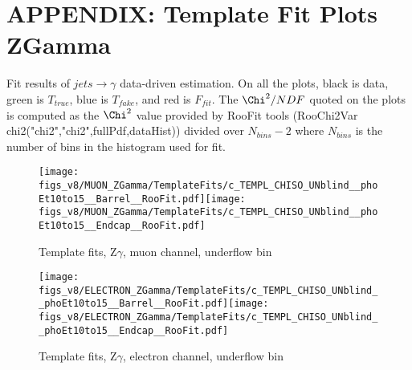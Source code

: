 \section{APPENDIX: Template Fit Plots ZGamma}
\label{sec:TemplateFitPlots}

Fit results of $jets \rightarrow \gamma$ data-driven estimation. On all the plots, black is data, green is $T_{true}$, blue is $T_{fake}$, and red is $F_{fit}$. The $\Chi^2/{NDF}$ quoted on the plots is computed as the $\Chi^2$ value provided by RooFit tools (RooChi2Var chi2("chi2","chi2",fullPdf,dataHist)) divided over $N_{bins}-2$ where $N_{bins}$ is the number of bins in the histogram used for fit.
  

\begin{figure}[htb]
  \begin{center}
   \texttt{[image: figs\_v8/MUON\_ZGamma/TemplateFits/c\_TEMPL\_CHISO\_UNblind\_\_phoEt10to15\_\_Barrel\_\_RooFit.pdf]}\texttt{[image: figs\_v8/MUON\_ZGamma/TemplateFits/c\_TEMPL\_CHISO\_UNblind\_\_phoEt10to15\_\_Endcap\_\_RooFit.pdf]}\\
  \label{fig:templateFits_CHISO_MUON_ZGamma_0}
  \caption{Template fits, Z$\gamma$, muon channel, underflow bin}
  \end{center}
\end{figure}

\begin{figure}[htb]
  \begin{center}
   \texttt{[image: figs\_v8/ELECTRON\_ZGamma/TemplateFits/c\_TEMPL\_CHISO\_UNblind\_\_phoEt10to15\_\_Barrel\_\_RooFit.pdf]}\texttt{[image: figs\_v8/ELECTRON\_ZGamma/TemplateFits/c\_TEMPL\_CHISO\_UNblind\_\_phoEt10to15\_\_Endcap\_\_RooFit.pdf]}\\
  \label{fig:templateFits_CHISO_ELECTRON_ZGamma_0}
  \caption{Template fits, Z$\gamma$, electron channel, underflow bin}
  \end{center}
\end{figure}

